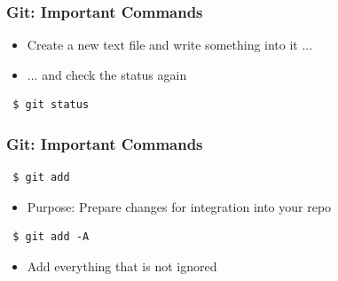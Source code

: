 \documentclass{beamer} %
\begin{document}
\begin{frame}[t, fragile]
\frametitle{Git: Important Commands}

\begin{itemize}
    \setlength\itemsep{1em}
    \item Create a new text file and write something into it ...
    \item ... and check the status again
\end{itemize}

\begin{verbatim} 
 $ git status
\end{verbatim}

\end{frame}


\begin{frame}[t, fragile]
\frametitle{Git: Important Commands}

\begin{verbatim} 
 $ git add
\end{verbatim}

\begin{itemize}
    \setlength\itemsep{1em}
	\item Purpose: Prepare changes for integration into your repo
\end{itemize}


\begin{verbatim} 
 $ git add -A
\end{verbatim}

\begin{itemize}
    \setlength\itemsep{1em}
	\item Add everything that is not ignored
\end{itemize}


\end{frame}
\end{document}

